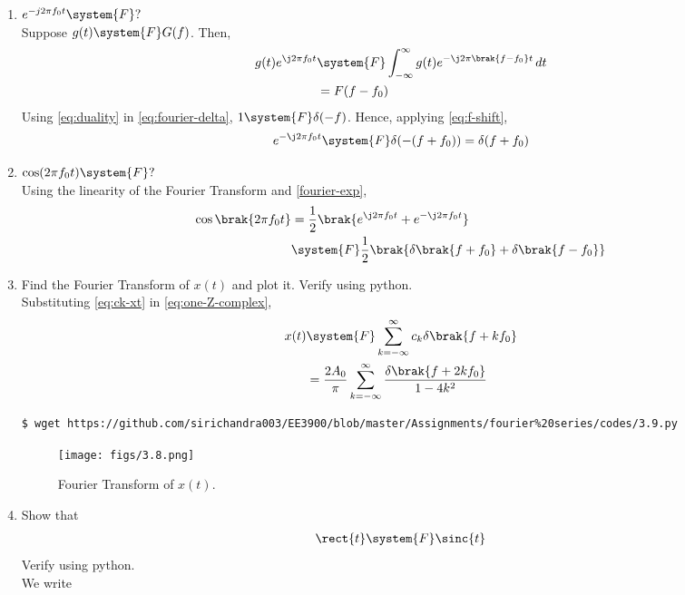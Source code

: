 \documentclass[journal,12pt,twocolumn]{IEEEtran}
\renewcommand\thesection{\arabic{section}}
\begin{document}
\begin{enumerate}[label=\thesection.\arabic*
,ref=\thesection.\theenumi]
\begin{align}
&=\int_{-\infty}^{\infty}\delta(t)\, dt = 1
\label{eq:fourier-delta}
\end{align}
\item $e^{-j2\pi f_0t}\system{F}?$ \\
\solution Suppose $g(t)\system{F}G(f)$. Then,
\begin{align}
g(t)e^{\j2\pi f_0t}&\system{F}\int_{-\infty}^{\infty}
g(t)e^{-\j2\pi\brak{f-f_0}t}\, dt \\
&=F(f-f_0)
\label{eq:f-shift}
\end{align}
Using \eqref{eq:duality} in \eqref{eq:fourier-delta}, $1\system{F}\delta(-f)$.
Hence, applying \eqref{eq:f-shift},
\begin{align}
e^{-\j2\pi f_0t}\system{F}\delta(-(f+f_0)) = \delta(f+f_0)
\label{eq:fourier-exp}
\end{align}
\item $\cos(2\pi f_0t)\system{F}?$ \\
\solution Using the linearity of the Fourier
Transform and \eqref{fourier-exp},
\begin{align}
\cos\brak{2\pi f_0t} &= \frac{1}{2}
\brak{e^{\j2\pi f_0t} + e^{-\j2\pi f_0t}} \\
&\system{F}\frac{1}{2}\brak{\delta\brak{f+f_0} + \delta\brak{f-f_0}}
\end{align}
\item Find the Fourier Transform of $x(t)$ and plot it. Verify using python. \\
\solution Substituting \eqref{eq:ck-xt} in \eqref{eq:one-Z-complex},
\begin{align}
x(t)&\system{F}\sum_{k=-\infty}^{\infty}c_k\delta\brak{f+kf_0} \\
&=\frac{2A_0}{\pi}\sum_{k=-\infty}^{\infty}\frac{\delta\brak{f+2kf_0}}{1-4k^2}
\label{eq:fourier-xt}
\end{align}
\begin{lstlisting}
$ wget https://github.com/sirichandra003/EE3900/blob/master/Assignments/fourier%20series/codes/3.9.py
\end{lstlisting}
\begin{figure}[!ht]
\texttt{[image: figs/3.8.png]}
\caption{Fourier Transform of $x(t)$.}
\label{eq:fig-fourier-xt}
\end{figure}
\item Show that
\begin{align}
\rect{t} \system{F} \sinc{t}
\end{align}
Verify using python. \\
\solution We write
\begin{align}

\end{align}
\end{enumerate}
\end{document}
